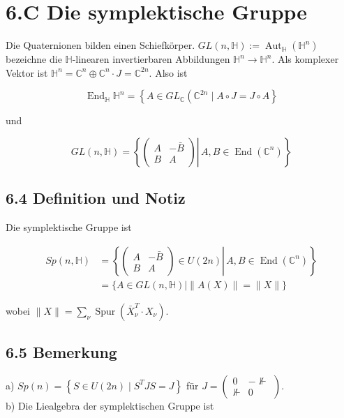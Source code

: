 \documentclass[10pt, letterpaper]{article}
\begin{document}
\section*{6.C Die symplektische Gruppe}
Die Quaternionen bilden einen Schiefkörper. $G L(n, \mathbb{H}):=\operatorname{Aut}_{\mathbb{H}}\left(\mathbb{H}^{n}\right)$ bezeichne die $\mathbb{H}$-linearen invertierbaren Abbildungen $\mathbb{H}^{n} \rightarrow \mathbb{H}^{n}$. Als komplexer Vektor ist $\mathbb{H}^{n}=\mathbb{C}^{n} \oplus \mathbb{C}^{n} \cdot J=\mathbb{C}^{2 n}$. Also ist

$$
\operatorname{End}_{\mathbb{H}} \mathbb{H}^{n}=\left\{A \in G L_{\mathbb{C}}\left(\mathbb{C}^{2 n} \mid A \circ J=J \circ A\right\}\right.
$$

und

$$
G L(n, \mathbb{H})=\left\{\left.\left(\begin{array}{cc}
A & -\bar{B} \\
B & A
\end{array}\right) \right\rvert\, A, B \in \operatorname{End}\left(\mathbb{C}^{n}\right)\right\}
$$

\subsection*{6.4 Definition und Notiz}
Die symplektische Gruppe ist

$$
\begin{aligned}
S p(n, \mathbb{H}) & =\left\{\left.\left(\begin{array}{cc}
A & -\bar{B} \\
B & A
\end{array}\right) \in U(2 n) \right\rvert\, A, B \in \operatorname{End}\left(\mathbb{C}^{n}\right)\right\} \\
& =\{A \in G L(n, \mathbb{H}) \mid\|A(X)\|=\|X\|\}
\end{aligned}
$$

wobei $\|X\|=\sum_{\nu} \operatorname{Spur}\left(\bar{X}_{\nu}^{T} \cdot X_{\nu}\right)$.

\subsection*{6.5 Bemerkung}
a) $S p(n)=\left\{S \in U(2 n) \mid S^{T} J S=J\right\}$ für $J=\left(\begin{array}{cc}0 & -\nVdash \\ \nVdash & 0\end{array}\right)$.\\
b) Die Liealgebra der symplektischen Gruppe ist
\end{document}
